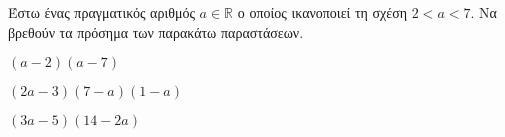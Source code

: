 Έστω ένας πραγματικός αριθμός $ a\in\mathbb{R} $ ο οποίος ικανοποιεί τη σχέση $ 2<a<7 $. Να βρεθούν τα πρόσημα των παρακάτω παραστάσεων.
\begin{alist}
\item $ (a-2)(a-7) $
\item $ (2a-3)(7-a)(1-a) $
\item $ (3a-5)(14-2a) $
\end{alist}
